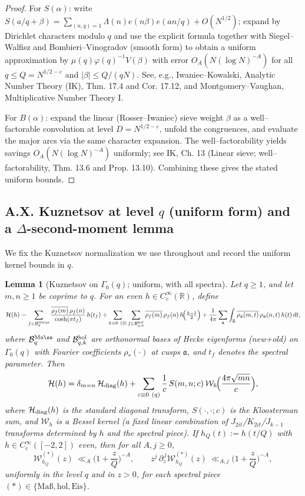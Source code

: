 \documentclass[11pt]{article}
\newtheorem{lemma}{Lemma}[section]
\theoremstyle{definition}
\theoremstyle{remark}
\begin{document}
\begin{proof}
	For $S(\alpha)$: write $S(a/q+\beta)=\sum_{(n,q)=1}\Lambda(n)e(n\beta)e(an/q)+O(N^{1/2})$; expand by Dirichlet characters modulo $q$ and use the explicit formula together with Siegel--Walfisz and Bombieri--Vinogradov (smooth form) to obtain a uniform approximation by $\mu(q)\varphi(q)^{-1}V(\beta)$ with error $O_A(N(\log N)^{-A})$ for all $q\le Q=N^{1/2-\varepsilon}$ and $|\beta|\le Q/(qN)$. See, e.g., Iwaniec--Kowalski, Analytic Number Theory (IK), Thm. 17.4 and Cor. 17.12, and Montgomery--Vaughan, Multiplicative Number Theory I.

	For $B(\alpha)$: expand the linear (Rosser--Iwaniec) sieve weight $\beta$ as a well--factorable convolution at level $D=N^{1/2-\varepsilon}$, unfold the congruences, and evaluate the major arcs via the same character expansion. The well--factorability yields savings $O_A(N(\log N)^{-A})$ uniformly; see IK, Ch. 13 (Linear sieve; well--factorability, Thm. 13.6 and Prop. 13.10). Combining these gives the stated uniform bounds.
\end{proof}

\subsection*{A.X. Kuznetsov at level $q$ (uniform form) and a $\Delta$-second-moment lemma}

We fix the Kuznetsov normalization we use throughout and record the uniform kernel bounds in $q$.

\begin{lemma}[Kuznetsov on $\Gamma_0(q)$; uniform, with all spectra]\label{lem:kuz-uniform}
	Let $q\ge1$, and let $m,n\ge1$ be coprime to $q$. For an even $h\in C_c^\infty(\mathbb R)$, define
	\[
		\mathcal{H}(h)
		=\sum_{f\in\mathcal B_q^{\rm Ma\ss}} \frac{\overline{\rho_f(m)}\,\rho_f(n)}{\cosh(\pi t_f)}\,h(t_f)
		+ \sum_{k\equiv0\ (2)} \sum_{f\in\mathcal B_{q,k}^{\rm hol}} \overline{\rho_f(m)}\,\rho_f(n)\,h\!\Big(\tfrac{k-1}{2}\Big)
		+\frac{1}{4\pi}\sum_{\mathfrak a}\int_{\mathbb R}\overline{\rho_{\mathfrak a}(m,t)}\,\rho_{\mathfrak a}(n,t)\,h(t)\,dt,
	\]
	where $\mathcal B_q^{\rm Ma\ss}$ and $\mathcal B_{q,k}^{\rm hol}$ are orthonormal bases of Hecke eigenforms (new+old) on $\Gamma_0(q)$ with Fourier coefficients $\rho_*(\cdot)$ at cusps $\mathfrak a$, and $t_f$ denotes the spectral parameter.
	Then
	\[
		\mathcal{H}(h)
		= \delta_{m=n}\,\mathcal H_{\rm diag}(h)
		+ \sum_{\substack{c\equiv 0\ (q)}} \frac{1}{c}\,S(m,n;c)\,\mathcal W_h\!\Big(\frac{4\pi\sqrt{mn}}{c}\Big),
	\]
	where $\mathcal H_{\rm diag}(h)$ is the standard diagonal transform, $S(\cdot,\cdot;c)$ is the Kloosterman sum, and $\mathcal W_h$ is a Bessel kernel (a fixed linear combination of $J_{2it}$/$K_{2it}$/$J_{k-1}$ transforms determined by $h$ and the spectral piece). If $h_Q(t):=h(t/Q)$ with $h\in C_c^\infty([-2,2])$ even, then for all $A,j\ge0$,
	\[
		\mathcal W_{h_Q}^{(*)}(z)\ \ll_A \Big(1+\frac{z}{Q}\Big)^{-A},
		\qquad
		z^j\,\partial_z^{\,j}\mathcal W_{h_Q}^{(*)}(z)\ \ll_{A,j}\Big(1+\frac{z}{Q}\Big)^{-A},
	\]
	uniformly in the level $q$ and in $z>0$, for each spectral piece $(*)\in\{\text{Ma\ss},\text{hol},\text{Eis}\}$.
\end{lemma}
\end{document}
